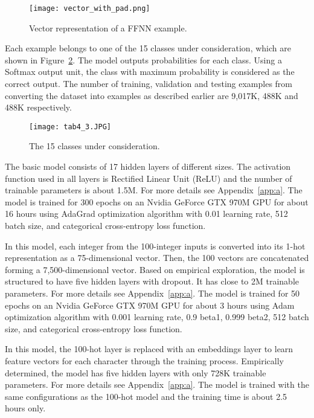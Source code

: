 \documentclass[11pt,a4paper]{article}
\newcommand{\para}[1]{\medskip \noindent {\bf #1}}
\begin{document}
\begin{figure}[h]
    \centering
    \texttt{[image: vector\_with\_pad.png]}
    \caption{Vector representation of a FFNN example.}
    \label{vector}
\end{figure}

Each example belongs to one of the 15 classes under consideration, which are shown in Figure~\ref{tab4_3}.
The model outputs probabilities for each class. Using a Softmax output unit, the class with maximum probability is considered as the correct output.
The number of training, validation and testing examples from converting the dataset into examples as described earlier are 9,017K, 488K and 488K respectively.

\begin{figure}
    \centering
    \texttt{[image: tab4\_3.JPG]}
    \caption{The 15 classes under consideration.}
    \label{tab4_3}
\end{figure}

\para{Basic Model.}
The basic model consists of 17 hidden layers of different sizes. The activation function used in all layers is Rectified Linear Unit (ReLU) and the number of trainable parameters is about 1.5M. For more details see Appendix~\ref{app:a}.
The model is trained for 300 epochs on an Nvidia GeForce GTX 970M GPU for about 16 hours using AdaGrad optimization algorithm \cite{duchi2011adaptive} with 0.01 learning rate, 512 batch size, and categorical cross-entropy loss function.

\para{100-Hot Model.}
In this model, each integer from the 100-integer inputs is converted into its 1-hot representation as a 75-dimensional vector. Then, the 100 vectors are concatenated forming a 7,500-dimensional vector.
Based on empirical exploration, the model is structured to have five hidden layers with dropout. It has close to 2M trainable parameters. For more details see Appendix~\ref{app:a}.
The model is trained for 50 epochs on an Nvidia GeForce GTX 970M GPU for about 3 hours using Adam optimization algorithm \cite{kingma2014adam} with 0.001 learning rate, 0.9 beta1, 0.999 beta2, 512 batch size, and categorical cross-entropy loss function.

\para{Embeddings Model.}
In this model, the 100-hot layer is replaced with an embeddings layer to learn feature vectors for each character through the training process.
Empirically determined, the model has five hidden layers with only 728K trainable parameters.
For more details see Appendix~\ref{app:a}.
The model is trained with the same configurations as the 100-hot model and the training time is about 2.5 hours only.
\end{document}
